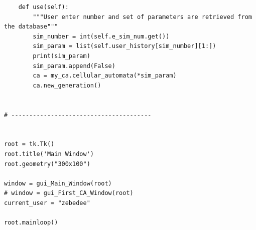 \documentclass[11pt, a4paper]{article}
\begin{document}
\begin{lstlisting}
    def use(self):
        """User enter number and set of parameters are retrieved from the database"""
        sim_number = int(self.e_sim_num.get())
        sim_param = list(self.user_history[sim_number][1:])
        print(sim_param)
        sim_param.append(False)
        ca = my_ca.cellular_automata(*sim_param)
        ca.new_generation()


# ---------------------------------------


root = tk.Tk()
root.title('Main Window')
root.geometry("300x100")

window = gui_Main_Window(root)
# window = gui_First_CA_Window(root)
current_user = "zebedee"

root.mainloop()

\end{lstlisting}
\end{document}
